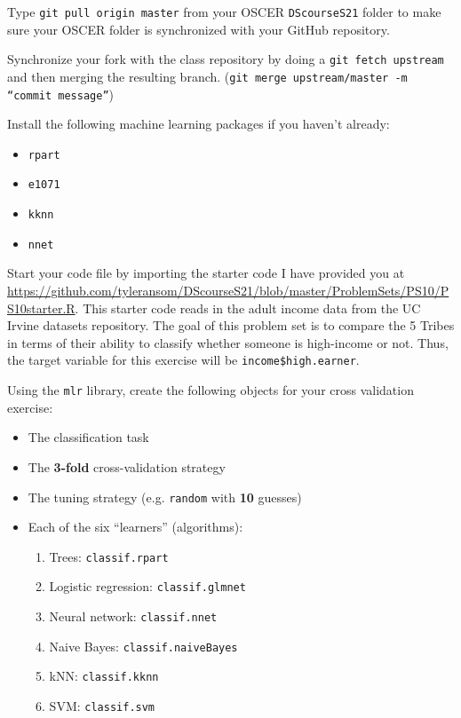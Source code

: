 \documentclass[12pt,english]{exam}
\begin{document}
\begin{questions}
\question Type \texttt{git pull origin master} from your OSCER \texttt{DScourseS21} folder to make sure your OSCER folder is synchronized with your GitHub repository. 

\question Synchronize your fork with the class repository by doing a \texttt{git fetch upstream} and then merging the resulting branch. (\texttt{git merge upstream/master -m ``commit message''})

\question Install the following machine learning packages if you haven't already:
\begin{itemize}
    \item \texttt{rpart}
    \item \texttt{e1071}
    \item \texttt{kknn}
    \item \texttt{nnet}
\end{itemize}

\question Start your code file by importing the starter code I have provided you at \url{https://github.com/tyleransom/DScourseS21/blob/master/ProblemSets/PS10/PS10starter.R}. This starter code reads in the adult income data from the UC Irvine datasets repository. The goal of this problem set is to compare the 5 Tribes in terms of their ability to classify whether someone is high-income or not. Thus, the target variable for this exercise will be \texttt{income\$high.earner}. 

\question Using the \texttt{mlr} library, create the following objects for your cross validation exercise:
\begin{itemize}
\item The classification task
\item The \textbf{3-fold} cross-validation strategy
\item The tuning strategy (e.g. \texttt{random} with \textbf{10} guesses)
\item Each of the six ``learners'' (algorithms):
    \begin{enumerate}
    \item Trees: \texttt{classif.rpart}
    \item Logistic regression: \texttt{classif.glmnet}    
    \item Neural network: \texttt{classif.nnet}      
    \item Naive Bayes: \texttt{classif.naiveBayes}
    \item kNN: \texttt{classif.kknn}       
    \item SVM: \texttt{classif.svm}       
    \end{enumerate}


\end{itemize}
\end{questions}
\end{document}
